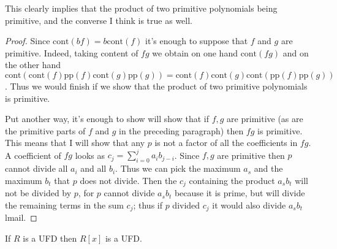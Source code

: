 This clearly implies that the product of two primitive polynomials being
primitive, and the converse I think is true as well.

\begin{proof}
Since $\text{cont}(bf)=b\text{cont}(f)$ it's enough to suppose that  $f$ and $g$
are primitive. Indeed, taking content of $fg$ we obtain on one hand
$\text{cont}(fg)$ and on the other hand
$\text{cont}(\text{cont}(f)\text{pp}(f)\text{cont}(g)\text{pp}(g))
=\text{cont}(f)\text{cont}(g)\text{cont}(\text{pp}(f)\text{pp}(g))$. 
Thus we would finish if we show that the product of two primitive polynomials is
primitive.

Put another way, it's enough to show will show that if $f,g$ are primitive (as
are the primitive parts of $f$ and $g$ in the preceding paragraph) then $fg$ is
primitive. This means that I will show that any $p$ is not a factor of all the
coefficients in $fg$. A coefficient of $fg$ looks as
$c_j=\sum_{i=0}^ja_ib_{j-i}$.  Since $f,g$ are primitive then $p$ cannot divide
all $a_i$ and all $b_i$.  Thus we can pick the maximum $a_s$ and the maximum
$b_t$ that $p$ does not divide. Then the $c_j$ containing the product $a_sb_t$
will not be divided by $p$, for $p$ cannot divide $a_sb_t$ because it is prime,
but will divide the remaining terms in the sum $c_j$; thus if $p$ divided $c_j$
it would also divide $a_sb_t$lmail.
\end{proof}

\begin{lemma}[Gauss]
\label{lemma-R-UFD-implies-R[x]-UFD}
\begin{reference}
\cite[Chapter 4, Theorem 2.3]{Lang-algebra}
\end{reference}
If $R$ is a UFD then $R[x]$ is a UFD.
\end{lemma}

